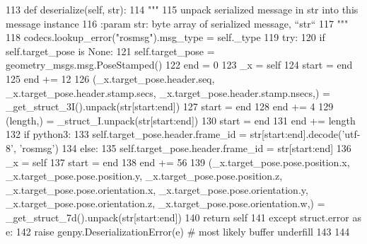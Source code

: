 \begin{DoxyCode}
113   \textcolor{keyword}{def }deserialize(self, str):
114     \textcolor{stringliteral}{"""}
115 \textcolor{stringliteral}{    unpack serialized message in str into this message instance}
116 \textcolor{stringliteral}{    :param str: byte array of serialized message, ``str``}
117 \textcolor{stringliteral}{    """}
118     codecs.lookup\_error(\textcolor{stringliteral}{"rosmsg"}).msg\_type = self.\_type
119     \textcolor{keywordflow}{try}:
120       \textcolor{keywordflow}{if} self.target\_pose \textcolor{keywordflow}{is} \textcolor{keywordtype}{None}:
121         self.target\_pose = geometry\_msgs.msg.PoseStamped()
122       end = 0
123       \_x = self
124       start = end
125       end += 12
126       (\_x.target\_pose.header.seq, \_x.target\_pose.header.stamp.secs, \_x.target\_pose.header.stamp.nsecs,) = 
      \_get\_struct\_3I().unpack(str[start:end])
127       start = end
128       end += 4
129       (length,) = \_struct\_I.unpack(str[start:end])
130       start = end
131       end += length
132       \textcolor{keywordflow}{if} python3:
133         self.target\_pose.header.frame\_id = str[start:end].decode(\textcolor{stringliteral}{'utf-8'}, \textcolor{stringliteral}{'rosmsg'})
134       \textcolor{keywordflow}{else}:
135         self.target\_pose.header.frame\_id = str[start:end]
136       \_x = self
137       start = end
138       end += 56
139       (\_x.target\_pose.pose.position.x, \_x.target\_pose.pose.position.y, \_x.target\_pose.pose.position.z, 
      \_x.target\_pose.pose.orientation.x, \_x.target\_pose.pose.orientation.y, \_x.target\_pose.pose.orientation.z, 
      \_x.target\_pose.pose.orientation.w,) = \_get\_struct\_7d().unpack(str[start:end])
140       \textcolor{keywordflow}{return} self
141     \textcolor{keywordflow}{except} struct.error \textcolor{keyword}{as} e:
142       \textcolor{keywordflow}{raise} genpy.DeserializationError(e)  \textcolor{comment}{# most likely buffer underfill}
143 
144 
\end{DoxyCode}
\mbox{\label{classexp__assignment2_1_1msg_1_1__PlanningGoal_1_1PlanningGoal_aa8c3650660b828320c0b9eb2664ae380}} 

